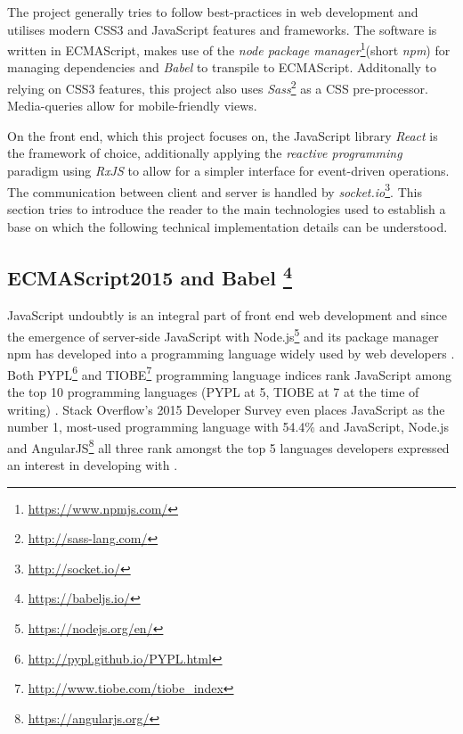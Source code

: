 The project generally tries to follow best-practices in web development and utilises modern CSS3 and JavaScript features and frameworks. The software is written in ECMA\-Script, makes use of the \emph{node package manager}\footnote{\url{https://www.npmjs.com/}}(short \emph{npm}) for managing dependencies and \emph{Babel} to transpile to ECMA\-Script. Additonally to relying on CSS3 features, this project also uses \emph{Sass}\footnote{\url{http://sass-lang.com/}} as a CSS pre-processor. Media-queries allow for mobile-friendly views.

On the front end, which this project focuses on, the JavaScript library \emph{React} is the framework of choice, additionally applying the \emph{reactive programming} paradigm using \emph{RxJS} to allow for a simpler interface for event-driven operations. The communication between client and server is handled by \emph{socket.io}\footnote{\url{http://socket.io/}}.
This section tries to introduce the reader to the main technologies used to establish a base on which the following technical implementation details can be understood.

\subsection[ECMAScript2015 and Babel]%
             {ECMAScript2015 and Babel%
             \protect\footnote{\url{https://babeljs.io/}}}%
\label{sec:implementation-technologies-es6}
JavaScript undoubtly is an integral part of front end web development and since the emergence of server-side JavaScript with Node.js\footnote{\url{https://nodejs.org/en/}} and its package manager npm has developed into a programming language widely used by web developers \cite{gpm-meta-transcompiler}. Both PYPL\footnote{\url{http://pypl.github.io/PYPL.html}} and TIOBE\footnote{\url{http://www.tiobe.com/tiobe_index}} programming language indices rank JavaScript among the top 10 programming languages (PYPL at 5, TIOBE at 7 at the time of writing) \cite{gpm-meta-transcompiler}. Stack Overflow's 2015 Developer Survey even places JavaScript as the number 1, most-used programming language with 54.4\% and JavaScript, Node.js and AngularJS\footnote{\url{https://angularjs.org/}} all three rank amongst the top 5 languages developers expressed an interest in developing with \cite{stackoverflow-developer-survey}.

